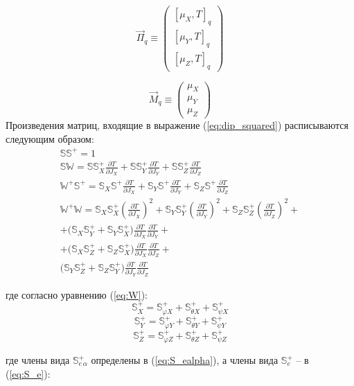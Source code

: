 \[
\vec{\Pi}_q \equiv\left(\begin{matrix}
[\mu_X,T]_q \\
[\mu_Y,T]_q \\
[\mu_Z,T]_q 
\end{matrix} \right) 
\]

\[
\vec{M}_q \equiv\left(\begin{matrix}
\mu_X \\
\mu_Y \\
\mu_Z
\end{matrix} \right) 
\]
Произведения матриц, входящие в выражение (\ref{eq:dip_squared}) расписываются следующим образом:
\begin{equation}
\begin{aligned}
\mathbb{S}\mathbb{S}^{+} = 1\\
\mathbb{S} \mathbb{W}  = \mathbb{S}\mathbb{S}^{+}_X  \frac{\partial T}{\partial J_X} +
\mathbb{S}\mathbb{S}^{+}_Y  \frac{\partial T}{\partial J_Y} +
\mathbb{S}\mathbb{S}^{+}_Z  \frac{\partial T}{\partial J_Z} \\
\mathbb{W}^{+}\mathbb{S}^{+} = \mathbb{S}_X\mathbb{S}^{+}  \frac{\partial T}{\partial J_X} +
\mathbb{S}_Y\mathbb{S}^{+}  \frac{\partial T}{\partial J_Y} +
\mathbb{S}_Z\mathbb{S}^{+}  \frac{\partial T}{\partial J_Z} \\
\mathbb{W}^{+} \mathbb{W} = \mathbb{S}_X\mathbb{S}^{+}_X  \left(\frac{\partial T}{\partial J_X}\right)^2 +
\mathbb{S}_Y\mathbb{S}^{+}_Y  \left(\frac{\partial T}{\partial J_Y}\right)^2 +
\mathbb{S}_Z\mathbb{S}^{+}_Z  \left(\frac{\partial T}{\partial J_Z}\right)^2 +\\
+ \big(\mathbb{S}_X\mathbb{S}^{+}_Y +\mathbb{S}_Y\mathbb{S}^{+}_X    \big)\frac{\partial T}{\partial J_X}\frac{\partial T}{\partial J_Y} +\\
+ \big(\mathbb{S}_X\mathbb{S}^{+}_Z +\mathbb{S}_Z\mathbb{S}^{+}_X    \big)\frac{\partial T}{\partial J_X}\frac{\partial T}{\partial J_Z} +\\
\big(\mathbb{S}_Y\mathbb{S}^{+}_Z +\mathbb{S}_Z\mathbb{S}^{+}_Y    \big)\frac{\partial T}{\partial J_Y}\frac{\partial T}{\partial J_Z} 
\end{aligned}
\end{equation}

где согласно уравнению (\ref{eq:W}):
\[
\mathbb{S}^{+}_{X} = \mathbb{S}^{+}_{\varphi X} + \mathbb{S}^{+}_{\theta X}+ \mathbb{S}^{+}_{\psi X}
\]
\[
\mathbb{S}^{+}_{Y} = \mathbb{S}^{+}_{\varphi Y} + \mathbb{S}^{+}_{\theta Y}+ \mathbb{S}^{+}_{\psi Y}
\]
\[
\mathbb{S}^{+}_{Z} = \mathbb{S}^{+}_{\varphi Z} + \mathbb{S}^{+}_{\theta Z}+ \mathbb{S}^{+}_{\psi Z}
\]

где члены вида $\mathbb{S}_{e\, \alpha}^{+}$ определены в (\ref{eq:S_ealpha}), а члены вида $\mathbb{S}_{e}^{+}$ -- в (\ref{eq:S_e}):
